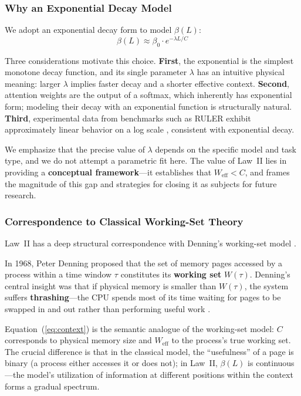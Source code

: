\documentclass[11pt,a4paper]{article}
\begin{document}
\subsubsection{Why an Exponential Decay Model}

We adopt an exponential decay form to model $\beta(L)$:
\begin{equation}
\beta(L) \approx \beta_{0} \cdot e^{-\lambda L / C}
\end{equation}

Three considerations motivate this choice. \textbf{First}, the exponential is the simplest monotone decay function, and its single parameter $\lambda$ has an intuitive physical meaning: larger $\lambda$ implies faster decay and a shorter effective context. \textbf{Second}, attention weights are the output of a softmax, which inherently has exponential form; modeling their decay with an exponential function is structurally natural. \textbf{Third}, experimental data from benchmarks such as RULER exhibit approximately linear behavior on a log scale \cite{ruler2024}, consistent with exponential decay.

We emphasize that the precise value of $\lambda$ depends on the specific model and task type, and we do not attempt a parametric fit here. The value of Law~II lies in providing a \textbf{conceptual framework}---it establishes that $W_{\mathrm{eff}} < C$, and frames the magnitude of this gap and strategies for closing it as subjects for future research.

\subsubsection{Correspondence to Classical Working-Set Theory}

Law~II has a deep structural correspondence with Denning's working-set model \cite{denning1968thrashing}.

In 1968, Peter Denning proposed that the set of memory pages accessed by a process within a time window $\tau$ constitutes its \textbf{working set} $W(\tau)$. Denning's central insight was that if physical memory is smaller than $W(\tau)$, the system suffers \textbf{thrashing}---the CPU spends most of its time waiting for pages to be swapped in and out rather than performing useful work \cite{denning1968thrashing,denning2020workingset}.

Equation~(\ref{eq:context}) is the semantic analogue of the working-set model: $C$ corresponds to physical memory size and $W_{\mathrm{eff}}$ to the process's true working set. The crucial difference is that in the classical model, the ``usefulness'' of a page is binary (a process either accesses it or does not); in Law~II, $\beta(L)$ is continuous---the model's utilization of information at different positions within the context forms a gradual spectrum.
\end{document}

